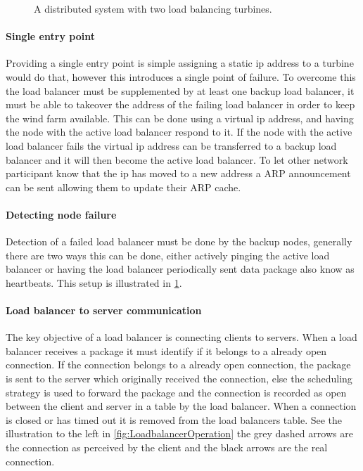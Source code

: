 \begin{figure}
	\centering	
	\scalebox{0.7}{}
	\caption[Distributed system with two load balancing turbines]{
		\label{fig:loadBalancingSetup2Balancers} 
		\footnotesize{%
			A distributed system with two load balancing turbines.
		}
	}
\end{figure}


\paragraph{Single entry point}
Providing a single entry point is simple assigning a static ip address to a turbine would do that, however this introduces a single point of failure.
To overcome this the load balancer must be supplemented by at least one backup load balancer, it must be able to takeover the address of the failing load balancer in order to keep the wind farm available.
This can be done using a virtual ip address, and having the node with the active load balancer respond to it.
If the node with the active load balancer fails the virtual ip address can be transferred to a backup load balancer and it will then become the active load balancer. To let other network participant know that the ip has moved to a new address a ARP announcement can be sent allowing them to update their ARP cache.

\paragraph{Detecting node failure}
Detection of a failed load balancer must be done by the backup nodes, generally there are two ways this can be done, either actively pinging the active load balancer or having the load balancer periodically sent data package also know as heartbeats. This setup is illustrated in \cref{fig:loadBalancingSetup2Balancers}.


\paragraph{Load balancer to server communication}
The key objective of a load balancer is connecting clients to servers.
When a load balancer receives a package it must identify if it belongs to a already open connection.
If the connection belongs to a already open connection, the package is sent to the server which originally received the connection, else the scheduling strategy is used to forward the package and the connection is recorded as open between the client and server in a table by the load balancer.
When a connection is closed or has timed out it is removed from the load balancers table. See the illustration to the left in \cref{fig:LoadbalancerOperation} the grey dashed arrows are the connection as perceived by the client and the black arrows are the real connection.


